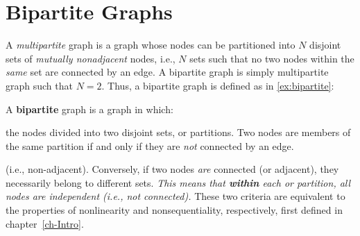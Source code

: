 \section{Bipartite Graphs}\label{sec:bipartite}
A \emph{multipartite} graph is a graph 
whose nodes can be partitioned into $N$ disjoint sets of 
\emph{mutually nonadjacent} nodes, i.e., $N$ sets such that no two
nodes within the \emph{same} set are connected by an edge. A bipartite graph
is simply multipartite graph such that $N = 2$. Thus, a bipartite graph is defined 
as in \ref{ex:bipartite}: 
\begin{exe} \label{ex:bipartite} \ex A \textbf{bipartite} graph is a graph in which:\begin{xlist} 
	\ex %
	the nodes divided into two disjoint sets, or partitions. \label{ex:bipartite1} %
	\ex %
	Two nodes are members of the same partition if and only if 
	they are \emph{not} connected by an edge.
	\label{ex:bipartite2}
	\end{xlist}
\end{exe}
(i.e., non-adjacent). Conversely, 
	if two nodes \emph{are} connected (or adjacent), they necessarily belong to different sets. 
	\emph{This means that \textbf{within} each or partition, all nodes are independent 
	(i.e., not connected).}
These two criteria are equivalent to the properties of nonlinearity and 
nonsequentiality, respectively, first defined in chapter~\ref{ch-Intro}.

